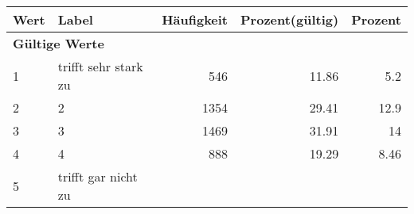      \begin{longtable}{lXrrr}
     \toprule
     \textbf{Wert} & \textbf{Label} & \textbf{Häufigkeit} & \textbf{Prozent(gültig)} & \textbf{Prozent} \\
     \endhead
     \midrule
     \multicolumn{5}{l}{\textbf{Gültige Werte}}\\

     1 &
     \multicolumn{1}{X}{ trifft sehr stark zu   } &


       \num{546} &
       \num[round-mode=places,round-precision=2]{11,86} &
         \num[round-mode=places,round-precision=2]{5,2} \\

     2 &
     \multicolumn{1}{X}{ 2   } &


       \num{1354} &
       \num[round-mode=places,round-precision=2]{29,41} &
         \num[round-mode=places,round-precision=2]{12,9} \\

     3 &
     \multicolumn{1}{X}{ 3   } &


       \num{1469} &
       \num[round-mode=places,round-precision=2]{31,91} &
         \num[round-mode=places,round-precision=2]{14} \\

     4 &
     \multicolumn{1}{X}{ 4   } &


       \num{888} &
       \num[round-mode=places,round-precision=2]{19,29} &
         \num[round-mode=places,round-precision=2]{8,46} \\

     5 &
     \multicolumn{1}{X}{ trifft gar nicht zu   } &



\end{longtable}
